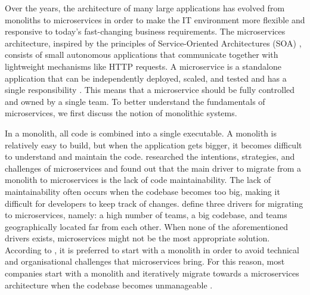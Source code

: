 Over the years, the architecture of many large applications has evolved from monoliths to microservices in order to make the IT environment more flexible and responsive to today's fast-changing business requirements. The microservices architecture, inspired by the principles of Service-Oriented Architectures (SOA) \cite{dragoni2017yesterday}, consists of small autonomous applications that communicate together with lightweight mechanisms like HTTP requests. A microservice is a standalone application that can be independently deployed, scaled, and tested and has a single responsibility \cite{thones2015microservices}. This means that a microservice should be fully controlled and owned by a single team. To better understand the fundamentals of microservices, we first discuss the notion of monolithic systems. \par
In a monolith, all code is combined into a single executable. A monolith is relatively easy to build, but when the application gets bigger, it becomes difficult to understand and maintain the code. \citeauthor{fritzsch2019microservices} \cite{fritzsch2019microservices} researched the intentions, strategies, and challenges of microservices and found out that the main driver to migrate from a monolith to microservices is the lack of code maintainability. The lack of maintainability often occurs when the codebase becomes too big, making it difficult for developers to keep track of changes. \citeauthor{kalske2017challenges} \cite{kalske2017challenges} define three drivers for migrating to microservices, namely: a high number of teams, a big codebase, and teams geographically located far from each other. When none of the aforementioned drivers exists, microservices might not be the most appropriate solution. According to \cite{kalske2017challenges}, it is preferred to start with a monolith in order to avoid technical and organisational challenges that microservices bring. For this reason, most companies start with a monolith and iteratively migrate towards a microservices architecture when the codebase becomes unmanageable \cite{fritzsch2019microservices, kalske2017challenges}. \par 